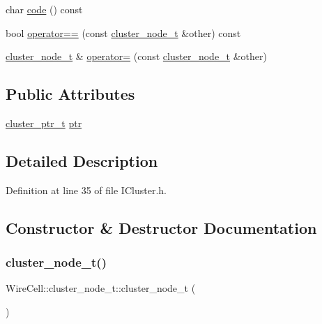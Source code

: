 \begin{DoxyCompactItemize}
\item 
char \hyperlink{struct_wire_cell_1_1cluster__node__t_a787bef82478db4e57b94337016bd69fd}{code} () const
\item 
bool \hyperlink{struct_wire_cell_1_1cluster__node__t_aa9badf743caf46bd785c858817eb65d0}{operator==} (const \hyperlink{struct_wire_cell_1_1cluster__node__t}{cluster\+\_\+node\+\_\+t} \&other) const
\item 
\hyperlink{struct_wire_cell_1_1cluster__node__t}{cluster\+\_\+node\+\_\+t} \& \hyperlink{struct_wire_cell_1_1cluster__node__t_a3f4e2b42526190ba5b21f02be9b030e4}{operator=} (const \hyperlink{struct_wire_cell_1_1cluster__node__t}{cluster\+\_\+node\+\_\+t} \&other)
\end{DoxyCompactItemize}
\subsection*{Public Attributes}
\begin{DoxyCompactItemize}
\item 
\hyperlink{namespace_wire_cell_a0dd058393dc7c7e35d888c206b9d479d}{cluster\+\_\+ptr\+\_\+t} \hyperlink{struct_wire_cell_1_1cluster__node__t_a9ae0d1a54a70bf0ab117a76ff07dd682}{ptr}
\end{DoxyCompactItemize}


\subsection{Detailed Description}


Definition at line 35 of file I\+Cluster.\+h.



\subsection{Constructor \& Destructor Documentation}
\mbox{\label{struct_wire_cell_1_1cluster__node__t_a6f862c89b46ddaf16bf83c0c35b19a78}} 
\subsubsection{\texorpdfstring{cluster\+\_\+node\+\_\+t()}{cluster\_node\_t()}\hspace{0.1cm}{\footnotesize\ttfamily [1/8]}}
{\footnotesize\ttfamily Wire\+Cell\+::cluster\+\_\+node\+\_\+t\+::cluster\+\_\+node\+\_\+t (\begin{DoxyParamCaption}{ }\end{DoxyParamCaption})\hspace{0.3cm}{\ttfamily [inline]}}



